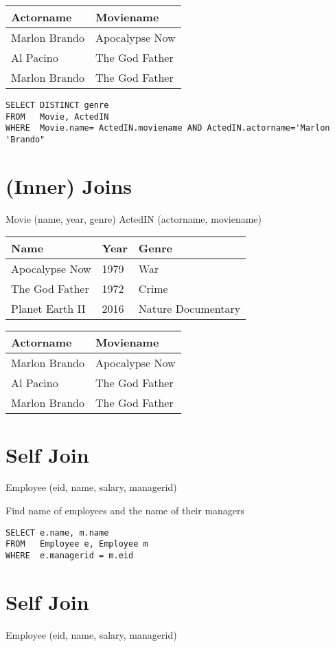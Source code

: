 \documentclass{article}
\begin{document}
\begin{tabular}{ll}
\hline
Actorname & Moviename \\
\hline
Marlon Brando & Apocalypse Now \\
Al Pacino & The God Father \\
Marlon Brando & The God Father \\
\hline
\end{tabular}
\begin{verbatim}
SELECT DISTINCT genre
FROM   Movie, ActedIN
WHERE  Movie.name= ActedIN.moviename AND ActedIN.actorname='Marlon 'Brando"
\end{verbatim}

\section*{(Inner) Joins}
Movie (name, year, genre)
ActedIN (actorname, moviename)

\begin{tabular}{lll}
\hline
Name & Year & Genre \\
\hline
Apocalypse Now & 1979 & War \\
The God Father & 1972 & Crime \\
Planet Earth II & 2016 & Nature Documentary \\
\hline
\end{tabular}

\begin{tabular}{ll}
\hline
Actorname & Moviename \\
\hline
Marlon Brando & Apocalypse Now \\
Al Pacino & The God Father \\
Marlon Brando & The God Father \\
\hline
\end{tabular}

\section*{Self Join}
Employee (eid, name, salary, managerid)

Find name of employees and the name of their managers

\begin{verbatim}
SELECT e.name, m.name
FROM   Employee e, Employee m
WHERE  e.managerid = m.eid
\end{verbatim}

\section*{Self Join}
Employee (eid, name, salary, managerid)
\end{document}
